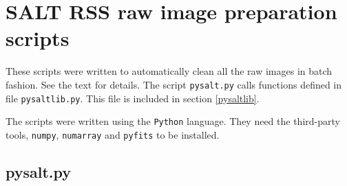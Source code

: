 \chapter{SALT RSS raw image preparation scripts}
\label{RSSclean}

These scripts were written to automatically clean all the raw images in batch fashion. See the text for details.
The script \texttt{pysalt.py} calls functions defined in file \texttt{pysaltlib.py}. This file is included 
in section \ref{pysaltlib}.

The scripts were written using the \texttt{Python} language. They need the third-party tools, \texttt{numpy},
\texttt{numarray} and \texttt{pyfits} to be installed.


\section{pysalt.py}
\label{pysalt}

